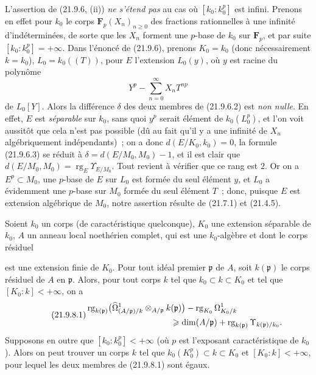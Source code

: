 \begin{remark}[21.9.7]
\label{0.21.9.7-fr}
L'assertion de (21.9.6, (ii)) \emph{ne s'étend pas} au cas où
$[k_0:k_0^p]$ est infini. Prenons en effet pour $k_0$ le corps
$\mathbf F_p(X_n)_{n\geqslant0}$ des fractions rationnelles à une infinité
d'indéterminées, de sorte que les $X_n$ forment une $p$-base de $k_0$ sur
$\mathbf F_p$, et par suite $[k_0:k_0^p]=+\infty$. Dans l'énoncé de (21.9.6),
prenons $K_0=k_0$ (donc nécessairement $k=k_0$), $L_0=k_0((T))$, pour $E$
l'extension $L_0(y)$, où $y$ est racine du polynôme
\[
  Y^p-\sum_{n=0}^{\infty}X_nT^{np}
\]
de $L_0[Y]$. Alors la différence $\delta$ des deux membres de (21.9.6.2) est
\emph{non nulle}. En effet, $E$ est \emph{séparable} sur $k_0$, sans quoi
$y^p$ serait élément de $k_0(L_0^p)$, et l'on voit aussitôt que cela n'est
pas possible (dû au fait qu'il y a une infinité de $X_n$ algébriquement
indépendants)~; on a donc $d(E/K_0,k_0)=0$, la formule (21.9.6.3) se réduit à
$\delta=d(E/M_0,M_0)-1$, et il est clair que
$d(E/M_0,M_0)=\operatorname{rg}_E\Upsilon_{E/M_0}$. Tout revient à vérifier
que ce rang est $2$. Or on a $E^p\subset M_0$, une $p$-base de $E$ sur $L_0$
est formée du seul élément $y$, et $L_0$ a évidemment une $p$-base sur $M_0$
formée du seul élément $T$~; donc, puisque $E$ est extension algébrique de
$M_0$, notre assertion résulte de (21.7.1) et (21.4.5).
\end{remark}

\begin{proposition}[21.9.8]
\label{0.21.9.8-fr}
Soient $k_0$ un corps (de caractéristique quelconque), $K_0$ une extension
séparable de $k_0$, $A$ un anneau local noethérien complet, qui est une
$k_0$-algèbre et dont le corps résiduel

est une extension finie de $K_0$. Pour tout idéal premier $\mathfrak p$ de
$A$, soit $k(\mathfrak p)$ le corps résiduel de $A$ en $\mathfrak p$. Alors,
pour tout corps $k$ tel que $k_0\subset k\subset K_0$ et tel que
$[K_0:k]<+\infty$, on a
\begin{equation}
\tag{21.9.8.1}
\label{0.21.9.8.1-fr}
\begin{split}
  &\operatorname{rg}_{k(\mathfrak p)}
    \bigl(\widehat\Omega^1_{(A/\mathfrak p)/k}
      \otimes_{A/\mathfrak p}k(\mathfrak p)\bigr)
    -\operatorname{rg}_{K_0}\Omega^1_{K_0/k}\\
  &\hspace{35mm}\geqslant
    \dim(A/\mathfrak p)
    +\operatorname{rg}_{k(\mathfrak p)}\Upsilon_{k(\mathfrak p)/k_0}.
\end{split}
\end{equation}
Supposons en outre que $[k_0:k_0^p]<+\infty$ (où $p$ est l'exposant
caractéristique de $k_0$). Alors on peut trouver un corps $k$ tel que
$k_0(K_0^p)\subset k\subset K_0$ et $[K_0:k]<+\infty$, pour lequel les deux
membres de (21.9.8.1) sont égaux.
\end{proposition}

